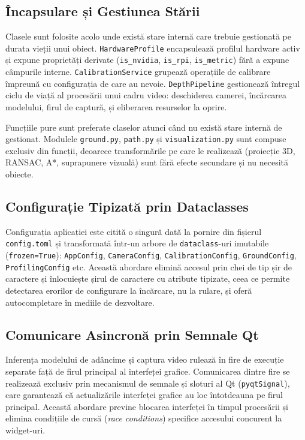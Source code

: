 \subsection{Încapsulare și Gestiunea Stării}

Clasele sunt folosite acolo unde există stare internă care trebuie gestionată pe durata vieții unui obiect. \texttt{HardwareProfile} encapsulează profilul hardware activ și expune proprietăți derivate (\texttt{is\_nvidia}, \texttt{is\_rpi}, \texttt{is\_metric}) fără a expune câmpurile interne. \texttt{CalibrationService} grupează operațiile de calibrare împreună cu configurația de care au nevoie. \texttt{DepthPipeline} gestionează întregul ciclu de viață al procesării unui cadru video: deschiderea camerei, încărcarea modelului, firul de captură, și eliberarea resurselor la oprire.

Funcțiile pure sunt preferate claselor atunci când nu există stare internă de gestionat. Modulele \texttt{ground.py}, \texttt{path.py} și \texttt{visualization.py} sunt compuse exclusiv din funcții, deoarece transformările pe care le realizează (proiecție 3D, RANSAC, A*, suprapunere vizuală) sunt fără efecte secundare și nu necesită obiecte.

\subsection{Configurație Tipizată prin Dataclasses}

Configurația aplicației este citită o singură dată la pornire din fișierul \texttt{config.toml} și transformată într-un arbore de \texttt{dataclass}-uri imutabile (\texttt{frozen=True}): \texttt{App\allowbreak Config}, \texttt{Camera\allowbreak Config}, \texttt{Calibration\allowbreak Config}, \texttt{Ground\allowbreak Config}, \texttt{Profiling\allowbreak Config} etc. Această abordare elimină accesul prin chei de tip șir de caractere și înlocuiește șirul de caractere cu atribute tipizate, ceea ce permite detectarea erorilor de configurare la încărcare, nu la rulare, și oferă autocompletare în mediile de dezvoltare.

\subsection{Comunicare Asincronă prin Semnale Qt}

Inferența modelului de adâncime și captura video rulează în fire de execuție separate față de firul principal al interfeței grafice. Comunicarea dintre fire se realizează exclusiv prin mecanismul de semnale și sloturi al Qt (\texttt{pyqtSignal}), care garantează că actualizările interfeței grafice au loc întotdeauna pe firul principal. Această abordare previne blocarea interfeței în timpul procesării și elimina condițiile de cursă (\textit{race conditions}) specifice accesului concurent la widget-uri.

